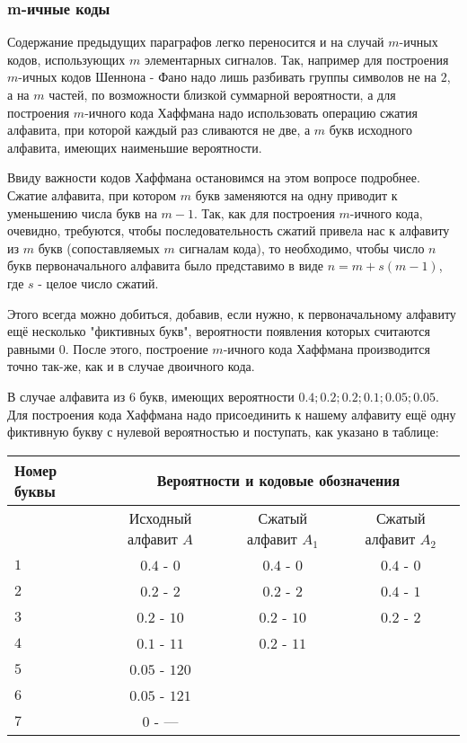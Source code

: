 ﻿\documentclass[a4paper,12pt]{report}
\begin{document}
\subsubsection{m-ичные коды}

	Содержание предыдущих параграфов легко переносится и на случай $m$-ичных кодов, использующих $m$ элементарных сигналов. Так, например для построения $m$-ичных кодов Шеннона - Фано надо лишь разбивать группы символов не на $2$, а на $m$ частей, по возможности близкой суммарной вероятности, а для построения $m$-ичного кода Хаффмана надо использовать операцию сжатия алфавита, при которой каждый раз сливаются не две, а $m$ букв исходного алфавита, имеющих наименьшие вероятности.

	Ввиду важности кодов Хаффмана остановимся на этом вопросе подробнее. Сжатие алфавита, при котором $m$ букв заменяются на одну приводит к уменьшению числа букв на $m-1$. Так, как для построения $m$-ичного кода, очевидно, требуются, чтобы последовательность сжатий привела нас к алфавиту из $m$ букв (сопоставляемых $m$ сигналам кода), то необходимо, чтобы число $n$ букв первоначального алфавита было представимо в виде $n = m + s(m-1)$, где $s$ - целое число сжатий.

	Этого всегда можно добиться, добавив, если нужно, к первоначальному алфавиту ещё несколько "фиктивных букв", вероятности появления которых считаются равными $0$. После этого, построение $m$-ичного кода Хаффмана производится точно так-же, как и в случае двоичного кода.
	
	 В случае алфавита из $6$ букв, имеющих вероятности $0.4; 0.2; 0.2; 0.1; 0.05; 0.05$. Для построения  кода Хаффмана надо присоединить к нашему алфавиту ещё одну фиктивную букву с нулевой вероятностью и поступать, как указано в таблице:

	\begin{tabular}{|l|c|c|c|}
	\hline
	Номер буквы & \multicolumn{3}{c|}{Вероятности и кодовые обозначения} \\
	\hline
	 & Исходный алфавит $A$ & Сжатый алфавит $A_1$ & Сжатый алфавит $A_2$ \\
	\hline
	$1$ & $0.4$ - $0$  &  $0.4$ - $0$  & $0.4$ - $0$ \\
	\hline %
	$2$ & $0.2$ - $2$  &  $0.2$ - $2$ &  $0.4$ - $1$ \\
	\hline %
	$3$ & $0.2$ - $10$ & $0.2$ - $10$ & $0.2$ - $2$  \\
	\hline 	
	$4$ & $0.1$ - $11$ & $0.2$ - $11$ & \\
	\hline %
	$5$ & $0.05$ - $120$ && \\
	\hline %
	$6$ & $0.05$ - $121$ && \\
	\hline %
	$7$ & $0$ - ---  && \\
	\hline %
	\end{tabular}
\end{document}
